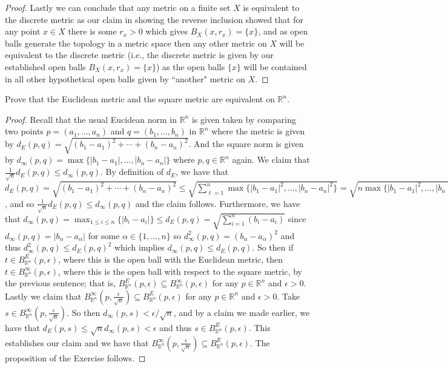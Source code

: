 \documentclass[10pt,reqno]{amsart}
\theoremstyle{definition}
\newcommand{\rr}{\mathbb R}
\begin{document}
\begin{tcolorbox}[colback=black!5!white,colframe=black!75!black,title= Chapter 3 $\S2.4$: Exercise 2.9.]
\begin{proof}
Lastly we can conclude that any metric on a finite set $X$ is equivalent to the discrete metric as our claim in showing the reverse inclusion showed that for any point $x \in X$ there is some $r_x >0 $ which gives $B_X(x,r_x) = \{ x\}$, and as open balls generate the topology in a metric space then any other metric on $X$ will be equivalent to the discrete metric (i.e., the discrete metric is given by our established open balls $B_X(x, r_x) = \{ x\}$) as the open balls $\{x \}$ will be contained in all other hypothetical open balls given by ``another" metric on $X$.
\end{proof}
\end{tcolorbox}
\begin{tcolorbox}[colback=black!5!white,colframe=black!75!black,title= Chapter 3 $\S2.4$: Exercise 2.10.]	 Prove that the Euclidean metric and the square metric are equivalent on $\rr^n$.
\tcblower
\begin{proof} Recall that the usual Eucidean norm in $\rr^n$ is given taken by comparing two points $p = (a_1, \ldots, a_n)$ and $q = (b_1, \ldots, b_n)$ in $\rr^n$ where the metric is given by $d_E(p,q) = \sqrt{(b_1 - a_1)^2 + \cdots + (b_n - a_n)^2}$. And the square norm is given by $d_\infty (p,q ) = \max \{ |b_1 - a_1|, \ldots, |b_n - a_n | \}$ where $p,q \in \rr^n$ again. We claim that $\frac{1}{\sqrt{n}} d_E(p,q) \leq d_\infty(p,q)$. By definition of $d_E$, we have that $d_E(p,q) = \sqrt{(b_1 - a_1)^2 + \cdots + (b_n - a_n)^2 } \leq \sqrt{ \sum _{\ell=1}^n\max \{|b_1-a_1|^2,\ldots, |b_n -a_n |^2\} } = \sqrt{n \max \{|b_1-a_1|^2,\ldots, |b_n -a_n |^2\}} = \sqrt{n} d_\infty (p,q)$, and so $\frac{1}{\sqrt{n}} d_E(p,q) \leq d_\infty (p,q)$ and the claim follows. Furthermore, we have that $d_\infty (p,q) = \max_{1 \leq i \leq n } \{ |b_i -a_i | \} \leq d_E(p,q) = \sqrt{\sum_{i=1}^n (b_i - a_i) }$ since $d_\infty (p,q) = |b_\alpha -a_\alpha|$ for some $\alpha \in \{1, \ldots, n \}$ so $d_\infty^2 (p,q) = (b_\alpha - a_\alpha)^2$ and thus $d_\infty ^2 (p,q) \leq d_E(p,q)^2$ which implies $d_\infty (p,q) \leq d_E(p,q)$. So then if $t \in B_{\rr^n}^E (p, \epsilon)$, where this is the open ball with the Euclidean metric, then $t \in B_{\rr^n}^\infty (p, \epsilon)$, where this is the open ball with respect to the square metric, by the previous sentence; that is, $B_{\rr^n}^E (p, \epsilon) \subseteq B_{\rr^n}^\infty (p, \epsilon)$ for any $p \in \rr^n$ and $\epsilon > 0$. Lastly we claim that $B_{\rr^n}^\infty (p, \frac{\epsilon}{\sqrt{n}}) \subseteq B_{\rr^n}^E (p, \epsilon)$ for any $p \in \rr^n$ and $\epsilon > 0$. Take $s \in B_{\rr^n}^\infty (p, \frac{\epsilon}{\sqrt{n}})$. So then $d_\infty (p, s) < \epsilon/\sqrt{n}$, and by a claim we made earlier, we have that $d_E(p,s) \leq \sqrt{n} d_\infty (p,s) < \epsilon$ and thus $s \in B_{\rr^n}^E (p, \epsilon)$. This establishes our claim and we have that $B_{\rr^n}^\infty (p, \frac{\epsilon}{\sqrt{n}})  \subseteq B_{\rr^n}^E (p, \epsilon)$. The proposition of the Exercise follows.
\end{proof}
\end{tcolorbox}
\end{document}
